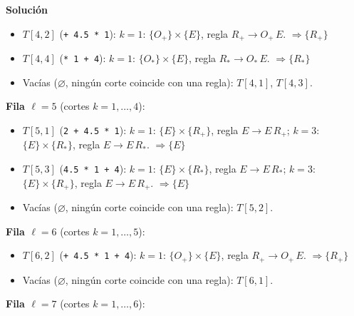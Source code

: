 \documentclass[12pt, letterpaper]{article}
\newenvironment{solucion}{\par\medskip\noindent\textbf{\large Solución}\par\smallskip}{\par\bigskip}
\begin{document}
\begin{enumerate}
\begin{solucion}
  \begin{itemize}[leftmargin=*,itemsep=0pt]
    
  \item $T[4,2]$ (\texttt{+ 4.5 * 1}): $k=1$: $\{O_{+}\} \times \{E\}$, regla $R_{+} \to O_{+}\,E$. $\Rightarrow \{R_{+}\}$
    
  \item $T[4,4]$ (\texttt{* 1 + 4}): $k=1$: $\{O_{*}\} \times \{E\}$, regla $R_{*} \to O_{*}\,E$. $\Rightarrow \{R_{*}\}$
    
  \item Vacías ($\varnothing$, ningún corte coincide con una regla): $T[4,1]$, $T[4,3]$.
    
  \end{itemize}
  
  \textbf{Fila $\ell=5$} (cortes $k=1,\dots,4$):
  
  \begin{itemize}[leftmargin=*,itemsep=0pt]
    
  \item $T[5,1]$ (\texttt{2 + 4.5 * 1}): $k=1$: $\{E\} \times \{R_{+}\}$, regla $E \to E\,R_{+}$; $k=3$: $\{E\} \times \{R_{*}\}$, regla $E \to E\,R_{*}$. $\Rightarrow \{E\}$
    
  \item $T[5,3]$ (\texttt{4.5 * 1 + 4}): $k=1$: $\{E\} \times \{R_{*}\}$, regla $E \to E\,R_{*}$; $k=3$: $\{E\} \times \{R_{+}\}$, regla $E \to E\,R_{+}$. $\Rightarrow \{E\}$
    
  \item Vacías ($\varnothing$, ningún corte coincide con una regla): $T[5,2]$.
    
  \end{itemize}
  
  \textbf{Fila $\ell=6$} (cortes $k=1,\dots,5$):
  
  \begin{itemize}[leftmargin=*,itemsep=0pt]
    
  \item $T[6,2]$ (\texttt{+ 4.5 * 1 + 4}): $k=1$: $\{O_{+}\} \times \{E\}$, regla $R_{+} \to O_{+}\,E$. $\Rightarrow \{R_{+}\}$
    
  \item Vacías ($\varnothing$, ningún corte coincide con una regla): $T[6,1]$.
    
  \end{itemize}
  
  \textbf{Fila $\ell=7$} (cortes $k=1,\dots,6$):
  

\end{solucion}
\end{enumerate}
\end{document}
